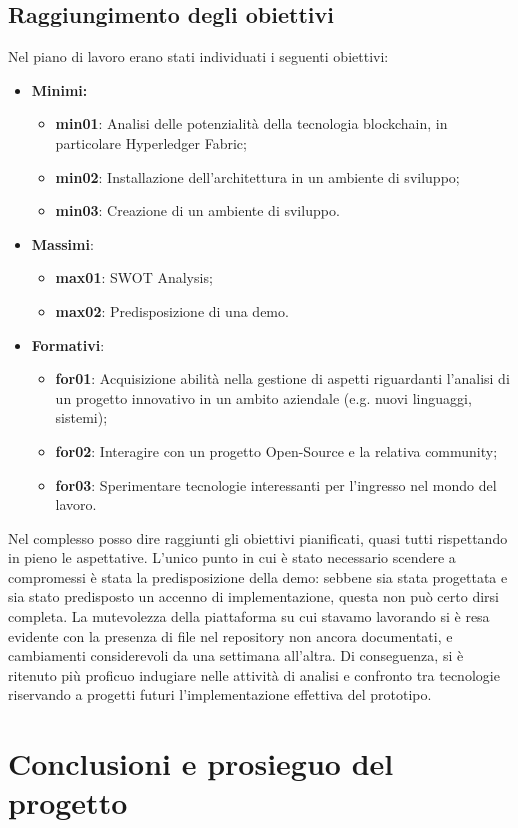 	\subsection{Raggiungimento degli obiettivi}
		Nel piano di lavoro erano stati individuati i seguenti obiettivi:
		\begin{itemize}
			\item \textbf{Minimi:}
				\begin{itemize}
					\item \textbf{min01}: Analisi delle potenzialità della tecnologia blockchain, in particolare Hyperledger Fabric;
					\item \textbf{min02}: Installazione dell’architettura in un ambiente di sviluppo;
					\item \textbf{min03}: Creazione di un ambiente di sviluppo.
				\end{itemize}
			
			\item \textbf{Massimi}:
				\begin{itemize}
					\item \textbf{max01}: SWOT Analysis;
					\item \textbf{max02}: Predisposizione di una demo.
				\end{itemize}
			
			\item \textbf{Formativi}:
				\begin{itemize}
					\item \textbf{for01}: Acquisizione abilità nella gestione di aspetti riguardanti l’analisi di un progetto innovativo in un ambito aziendale (e.g. nuovi linguaggi, sistemi);
					\item \textbf{for02}: Interagire con un progetto Open-Source e la relativa community;
					\item \textbf{for03}: Sperimentare tecnologie interessanti per l’ingresso nel mondo del lavoro.
				\end{itemize}
		\end{itemize}
		
		Nel complesso posso dire raggiunti gli obiettivi pianificati, quasi tutti rispettando in pieno le aspettative. L'unico punto in cui è stato necessario scendere a compromessi è stata la predisposizione della demo: sebbene sia stata progettata e sia stato predisposto un accenno di implementazione, questa non può certo dirsi completa. La mutevolezza della piattaforma su cui stavamo lavorando si è resa evidente con la presenza di file nel repository non ancora documentati, e cambiamenti considerevoli da una settimana all'altra. Di conseguenza, si è ritenuto più proficuo indugiare nelle attività di analisi e confronto tra tecnologie riservando a progetti futuri l'implementazione effettiva del prototipo.
\section{Conclusioni e prosieguo del progetto}
	